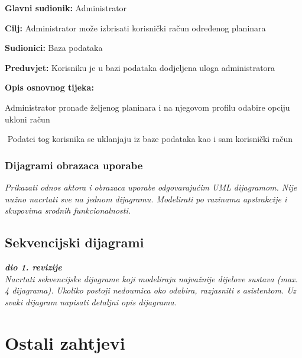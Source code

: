 		\noindent {}
		\begin{packed_item}
			
			\item \textbf{Glavni sudionik: }$ $Administrator$ $
			\item  \textbf{Cilj:} $ $Administrator može izbrisati korisnički račun određenog planinara $ $
			\item  \textbf{Sudionici:} $ $Baza podataka $ $
			\item  \textbf{Preduvjet:} $ $Korisniku je u bazi podataka dodjeljena uloga administratora$ $
			\item  \textbf{Opis osnovnog tijeka:}
			
			\item[] \begin{packed_enum}
				
				\item $ $Administrator pronađe željenog planinara i na njegovom profilu odabire opciju ukloni račun$ $
				\item $ $ Podatci tog korisnika se uklanjaju iz baze podataka kao i sam korisnički račun $ $
				
				
			\end{packed_enum}
		\end{packed_item}
	
		\subsubsection{Dijagrami obrazaca uporabe}
		
		\textit{Prikazati odnos aktora i obrazaca uporabe odgovarajućim UML dijagramom. Nije nužno nacrtati sve na jednom dijagramu. Modelirati po razinama apstrakcije i skupovima srodnih funkcionalnosti.}
		\eject	
				
			\subsection{Sekvencijski dijagrami}
				
				\textbf{\textit{dio 1. revizije}}\\
				
				\textit{Nacrtati sekvencijske dijagrame koji modeliraju najvažnije dijelove sustava (max. 4 dijagrama). Ukoliko postoji nedoumica oko odabira, razjasniti s asistentom. Uz svaki dijagram napisati detaljni opis dijagrama.}
				\eject
	
		\section{Ostali zahtjevi}
		
